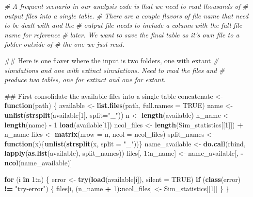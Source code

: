 \documentclass[]{book}
\newenvironment{Shaded}{\begin{snugshade}}{\end{snugshade}}
\newcommand{\KeywordTok}[1]{\textcolor[rgb]{0.13,0.29,0.53}{\textbf{{#1}}}}
\newcommand{\DataTypeTok}[1]{\textcolor[rgb]{0.13,0.29,0.53}{{#1}}}
\newcommand{\DecValTok}[1]{\textcolor[rgb]{0.00,0.00,0.81}{{#1}}}
\newcommand{\StringTok}[1]{\textcolor[rgb]{0.31,0.60,0.02}{{#1}}}
\newcommand{\CommentTok}[1]{\textcolor[rgb]{0.56,0.35,0.01}{\textit{{#1}}}}
\newcommand{\OtherTok}[1]{\textcolor[rgb]{0.56,0.35,0.01}{{#1}}}
\newcommand{\ControlFlowTok}[1]{\textcolor[rgb]{0.13,0.29,0.53}{\textbf{{#1}}}}
\newcommand{\OperatorTok}[1]{\textcolor[rgb]{0.81,0.36,0.00}{\textbf{{#1}}}}
\newcommand{\NormalTok}[1]{{#1}}
\theoremstyle{definition}
\theoremstyle{definition}
\theoremstyle{definition}
\theoremstyle{remark}
\begin{document}
\begin{Shaded}
\begin{Highlighting}[]
\CommentTok{# A frequent scenario in our analysis code is that we need to read thousands of }
\CommentTok{# output files into a single table. }
\CommentTok{# There are a couple flavors of file name that need to be dealt with and the }
\CommentTok{# output file needs to include a column with the full file name for reference }
\CommentTok{# later. We want to save the final table as it's own file to a folder outside of }
\CommentTok{# the one we just read. }

\NormalTok{## Here is one flaver where the input is two folders, one with extant }
\CommentTok{# simulations and one with extinct simulations. Need to read the files and }
\CommentTok{# produce two tables, one for extinct and one for extant. }

\NormalTok{## First consolidate the available files into a single table}
\NormalTok{concatenate <-}\StringTok{ }\ControlFlowTok{function}\NormalTok{(path) \{}
\NormalTok{ available <-}\StringTok{ }\KeywordTok{list.files}\NormalTok{(path, }\DataTypeTok{full.names =} \OtherTok{TRUE}\NormalTok{)}
\NormalTok{ name <-}\StringTok{ }\KeywordTok{unlist}\NormalTok{(}\KeywordTok{strsplit}\NormalTok{(available[}\DecValTok{1}\NormalTok{], }\DataTypeTok{split=}\StringTok{"_"}\NormalTok{))}
\NormalTok{ n <-}\StringTok{ }\KeywordTok{length}\NormalTok{(available)}
\NormalTok{ n_name <-}\StringTok{ }\KeywordTok{length}\NormalTok{(name) }\OperatorTok{-}\StringTok{ }\DecValTok{1}
 \KeywordTok{load}\NormalTok{(available[}\DecValTok{1}\NormalTok{])}
\NormalTok{ ncol_files <-}\StringTok{ }\KeywordTok{length}\NormalTok{(Sim_statistics[[}\DecValTok{1}\NormalTok{]]) }\OperatorTok{+}\StringTok{ }\NormalTok{n_name}
\NormalTok{ files <-}\StringTok{ }\KeywordTok{matrix}\NormalTok{(}\DataTypeTok{nrow =}\NormalTok{ n,}
                 \DataTypeTok{ncol =}\NormalTok{ ncol_files)}
\NormalTok{ split_names <-}\StringTok{ }\ControlFlowTok{function}\NormalTok{(x)\{}\KeywordTok{unlist}\NormalTok{(}\KeywordTok{strsplit}\NormalTok{(x, }\DataTypeTok{split =} \StringTok{"_"}\NormalTok{))\}}
\NormalTok{ name_available <-}\StringTok{ }\KeywordTok{do.call}\NormalTok{(rbind, }\KeywordTok{lapply}\NormalTok{(}\KeywordTok{as.list}\NormalTok{(available), split_names))}
\NormalTok{ files[, }\DecValTok{1}\OperatorTok{:}\NormalTok{n_name] <-}\StringTok{ }\NormalTok{name_available[, }\OperatorTok{-}\KeywordTok{ncol}\NormalTok{(name_available)]}

 \ControlFlowTok{for}\NormalTok{ (i }\ControlFlowTok{in} \DecValTok{1}\OperatorTok{:}\NormalTok{n) \{}
\NormalTok{   error <-}\StringTok{ }\KeywordTok{try}\NormalTok{(}\KeywordTok{load}\NormalTok{(available[i]), }\DataTypeTok{silent =} \OtherTok{TRUE}\NormalTok{)}
   \ControlFlowTok{if}\NormalTok{ (}\KeywordTok{class}\NormalTok{(error) }\OperatorTok{!=}\StringTok{ "try-error"}\NormalTok{) \{}
\NormalTok{     files[i, (n_name }\OperatorTok{+}\StringTok{ }\DecValTok{1}\NormalTok{)}\OperatorTok{:}\NormalTok{ncol_files] <-}\StringTok{ }\NormalTok{Sim_statistics[[}\DecValTok{1}\NormalTok{]]}
\NormalTok{   \}}
\NormalTok{ \}}



\end{Highlighting}
\end{Shaded}
\end{document}
